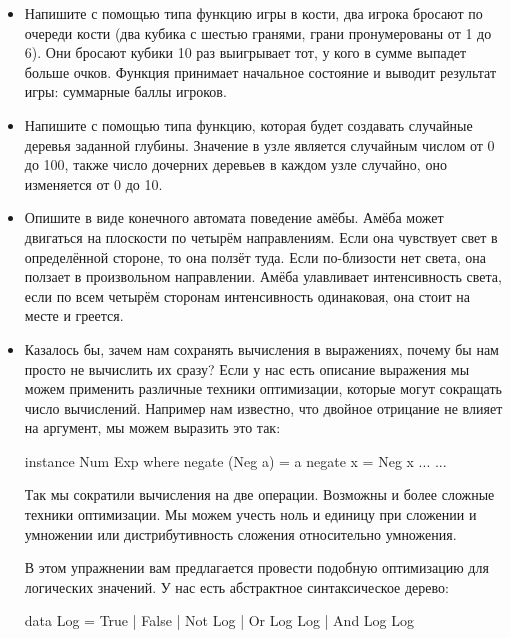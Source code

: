 \begin{itemize}

\item Напишите с помощью типа  функцию
игры в кости, два игрока бросают по очереди 
кости (два кубика с шестью гранями, грани пронумерованы
от 1 до 6). Они бросают
кубики 10 раз выигрывает тот, у кого в сумме выпадет 
больше очков. Функция принимает начальное состояние
и выводит результат игры: суммарные баллы игроков.

\item Напишите с помощью типа 
функцию, которая будет создавать 
случайные деревья заданной глубины. Значение в узле 
является случайным числом от 0 до 100, также число
дочерних деревьев в каждом узле случайно, оно 
изменяется от 0 до 10.

\item Опишите в виде конечного автомата поведение амёбы.
Амёба может двигаться на плоскости по четырём направлениям. 
Если она чувствует свет в определённой стороне, то она 
ползёт туда. Если по-близости нет света, она ползает
в произвольном направлении. Амёба улавливает интенсивность
света, если по всем четырём сторонам интенсивность
одинаковая, она стоит на месте и греется.

\item Казалось бы, зачем нам сохранять вычисления в 
выражениях, почему бы нам просто не вычислить их сразу? 
Если у нас есть описание выражения мы можем применить
различные техники оптимизации, которые могут сокращать
число вычислений. Например нам известно, что 
двойное отрицание не влияет на аргумент, мы можем
выразить это так:

\begin{code}
instance Num Exp where
    negate (Neg a)  = a
    negate x        = Neg x
    ...
    ...
\end{code}

Так мы сократили вычисления на две операции. Возможны и
более сложные техники оптимизации. Мы можем учесть ноль
и единицу при сложении и умножении или дистрибутивность
сложения относительно умножения.

В этом упражнении вам предлагается провести подобную
оптимизацию для логических значений. 
У нас есть абстрактное синтаксическое дерево:

\begin{code}
data Log    = True
            | False
            | Not Log
            | Or  Log Log
            | And Log Log            
\end{code}


\end{itemize}
